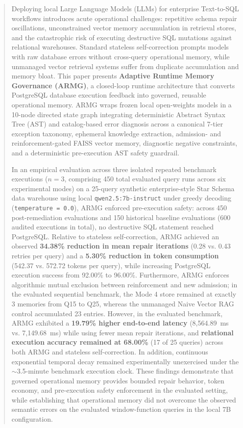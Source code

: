 \begin{abstract}
Deploying local Large Language Models (LLMs) for enterprise Text-to-SQL workflows introduces acute operational challenges: repetitive schema repair oscillations, unconstrained vector memory accumulation in retrieval stores, and the catastrophic risk of executing destructive SQL mutations against relational warehouses. Standard stateless self-correction prompts models with raw database errors without cross-query operational memory, while unmanaged vector retrieval systems suffer from duplicate accumulation and memory bloat. This paper presents \textbf{Adaptive Runtime Memory Governance (ARMG)}, a closed-loop runtime architecture that converts PostgreSQL database execution feedback into governed, reusable operational memory. ARMG wraps frozen local open-weights models in a 10-node directed state graph integrating deterministic Abstract Syntax Tree (AST) and catalog-based error diagnosis across a canonical 7-tier exception taxonomy, ephemeral knowledge extraction, admission- and reinforcement-gated FAISS vector memory, diagnostic negative constraints, and a deterministic pre-execution AST safety guardrail.

In an empirical evaluation across three isolated repeated benchmark executions ($n = 3$, comprising 450 total evaluated query runs across six experimental modes) on a 25-query synthetic enterprise-style Star Schema data warehouse using local \texttt{qwen2.5:7b-instruct} under greedy decoding (\texttt{temperature = 0.0}), ARMG enforced pre-execution safety: across 450 post-remediation evaluations and 150 historical baseline evaluations (600 audited executions in total), no destructive SQL statement reached PostgreSQL. Relative to stateless self-correction, ARMG achieved an observed \textbf{34.38\% reduction in mean repair iterations} (0.28 vs. 0.43 retries per query) and a \textbf{5.30\% reduction in token consumption} (542.37 vs. 572.72 tokens per query), while increasing PostgreSQL execution success from 92.00\% to 96.00\%. Furthermore, ARMG enforces algorithmic mutual exclusion between reinforcement and new admission; in the evaluated sequential benchmark, the Mode 4 store remained at exactly 3 memories from Q15 to Q25, whereas the unmanaged Naive Vector RAG control accumulated 23 entries. However, in the evaluated benchmark, ARMG exhibited a \textbf{19.79\% higher end-to-end latency} (8,564.89~ms vs. 7,149.68~ms) while using fewer mean repair iterations, and \textbf{relational execution accuracy remained at 68.00\%} (17 of 25 queries) across both ARMG and stateless self-correction. In addition, continuous exponential temporal decay remained experimentally unexercised under the $\sim$3.5-minute benchmark execution clock. These findings demonstrate that governed operational memory provides bounded repair behavior, token economy, and pre-execution safety enforcement in the evaluated setting, while establishing that operational memory did not overcome the observed semantic errors on the evaluated window-function queries in the local 7B configuration.
\end{abstract}

